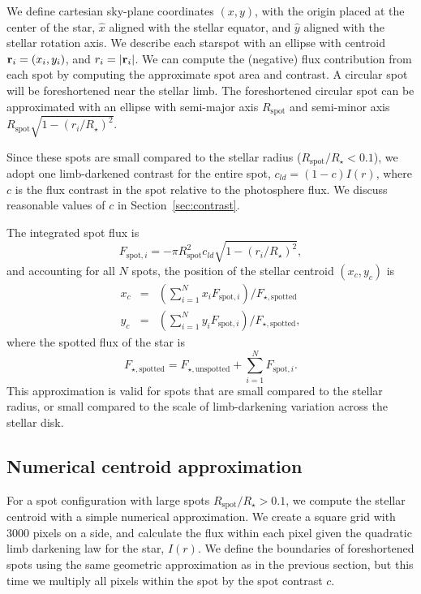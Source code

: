 We define cartesian sky-plane coordinates $(x,y)$, with the origin placed at the center of the star, $\hat{x}$  aligned with the stellar equator, and $\hat{y}$ aligned with the stellar rotation axis. We describe each starspot with an ellipse with centroid ${\bf r}_i = (x_i, y_i)$, and $r_i = \vert {\bf r}_i \vert$.  We can compute the (negative) flux contribution from each spot by computing the approximate spot area and contrast. A circular spot will be foreshortened near the stellar limb. The foreshortened circular spot can be approximated with an ellipse with semi-major axis $R_{\mathrm{spot}}$ and semi-minor axis $R_{\mathrm{spot}} \sqrt{1 - (r_i/R_\star)^2}$. 

Since these spots are small compared to the stellar radius ($R_{\mathrm{spot}}/R_\star < 0.1$), we adopt one limb-darkened contrast for the entire spot, $c_{ld} = (1-c) I(r)$, where $c$ is the flux contrast in the spot relative to the photosphere flux. We discuss reasonable values of $c$ in Section~\ref{sec:contrast}.

The integrated spot flux is 
\begin{equation}
F_{\mathrm{spot}, i} = - \pi R_{\mathrm{spot}}^2 c_{ld} \sqrt{1 - (r_i/R_\star)^2}, 
\end{equation}
and accounting for all $N$ spots, the position of the stellar centroid $(x_c, y_c)$ is  
\begin{eqnarray}
x_c &=& \left(\sum_{i=1}^{N} x_iF_{\mathrm{spot}, i}\right) / F_{\star, \mathrm{spotted}}\\
y_c &=& \left(\sum_{i=1}^{N} y_iF_{\mathrm{spot}, i}\right) / F_{\star, \mathrm{spotted}},
\end{eqnarray}
where the spotted flux of the star is
\begin{equation}
F_{\star, \mathrm{spotted}} = F_{\star, \mathrm{unspotted}}  + \sum_{i=1}^{N} F_{\mathrm{spot}, i}.
\end{equation}
This approximation is valid for spots that are small compared to the stellar radius, or small compared to the scale of limb-darkening variation across the stellar disk.

\subsection{Numerical centroid approximation}

For a spot configuration with large spots $R_{\mathrm{spot}}/R_\star > 0.1$, we compute the stellar centroid with a simple numerical approximation. We create a square grid with 3000 pixels on a side, and calculate the flux within each pixel given the quadratic limb darkening law for the star, $I(r)$.  We define the boundaries of foreshortened spots using the same geometric approximation as in the previous section, but this time we multiply all pixels within the spot by the spot contrast $c$. 

